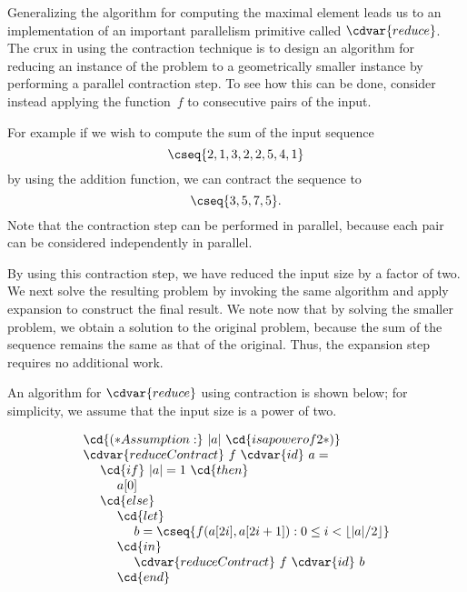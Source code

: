 \begin{cluster}
\label{grp:grm:design::contraction::generalizing}

\begin{gram}
\label{grm:design::contraction::generalizing}
Generalizing the algorithm for computing the maximal element leads us
to an implementation of an important parallelism primitive called $\cdvar{reduce}$.
The crux in using the contraction technique is to design an algorithm
for reducing an instance of the problem to a geometrically smaller
instance by performing a parallel contraction step.
To see how this can be done, consider instead applying the
function~$f$ to consecutive pairs of the input.

For example if we wish to compute the sum of the input sequence 
\[
\cseq{ 2,1,3,2,2,5,4,1}
\]
by using the addition function, we can contract the sequence to
\[
\cseq{ 3, 5, 7, 5 }.
\]
Note that the contraction step can be performed in parallel, because
each pair can be considered independently in parallel.

By using this contraction step, we have reduced the input size by a
factor of two.
We next solve the resulting problem by invoking the same algorithm and
apply expansion to construct the final result.
We note now that by solving the smaller problem, we obtain a solution
to the original problem, because the sum of the sequence remains the
same as that of the original.  Thus, the expansion step requires no
additional work.

\end{gram}
\end{cluster}

\begin{cluster}
\label{grp:alg:design::contraction::reduce}

\begin{algorithm}
\label{alg:design::contraction::reduce}
An algorithm for $\cdvar{reduce}$ using contraction is shown below; for
simplicity, we assume that the input size is a power of two.

\[
\begin{array}{l}
\cd{(* Assumption:}~|a|~\cd{is a power of 2 *)}
\\
\cdvar{reduceContract}~f~\cdvar{id}~a =
\\ 
~~~~\cd{if}~|a| = 1~\cd{then}
\\
~~~~~~~~a[0]
\\
~~~~\cd{else}
\\ 
~~~~~~~~\cd{let}
\\
~~~~~~~~~~~~b = \cseq{f(a[2i],a[2i+1]) : 0 \le i < \lfloor |a|/2
  \rfloor}
\\ 
~~~~~~~~\cd{in}
\\
~~~~~~~~~~~~\cdvar{reduceContract}~f~\cdvar{id}~b
\\
~~~~~~~~\cd{end}
\end{array}
\]

\end{algorithm}
\end{cluster}

